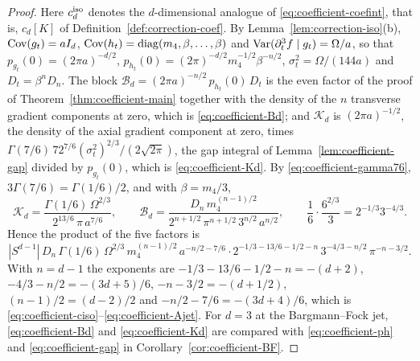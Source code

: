 \begin{proof}
Here $c_d^{\rm iso}$ denotes the $d$-dimensional analogue of \eqref{eq:coefficient-coefint}, that is, $c_d[K]$ of Definition~\ref{def:correction-coef}. By Lemma~\ref{lem:correction-iso}(b), $\operatorname{Cov}(g_t)=aI_d$, $\operatorname{Cov}(h_t)=\operatorname{diag}(m_4,\beta,\dots,\beta)$ and $\operatorname{Var}(\partial_t^3f\mid g_t)=\Omega/a$, so that $p_{g_t}(0)=(2\pi a)^{-d/2}$, $p_{h_t}(0)=(2\pi)^{-d/2}m_4^{-1/2}\beta^{-n/2}$, $\sigma_t^2=\Omega/(144a)$ and $D_t=\beta^nD_n$. The block $\mathcal B_d=(2\pi a)^{-n/2}\,p_{h_t}(0)\,D_t$ is the even factor of the proof of Theorem~\ref{thm:coefficient-main} together with the density of the $n$ transverse gradient components at zero, which is \eqref{eq:coefficient-Bd}; and $\mathcal K_d$ is $(2\pi a)^{-1/2}$, the density of the axial gradient component at zero, times $\Gamma(7/6)\,72^{7/6}(\sigma_t^2)^{2/3}/(2\sqrt{2\pi})$, the gap integral of Lemma~\ref{lem:coefficient-gap} divided by $p_{g_t}(0)$, which is \eqref{eq:coefficient-Kd}. By \eqref{eq:coefficient-gamma76}, $3\Gamma(7/6)=\Gamma(1/6)/2$, and with $\beta=m_4/3$,
\[
\mathcal K_d=\frac{\Gamma(1/6)\,\Omega^{2/3}}{2^{13/6}\,\pi\,a^{7/6}},\qquad
\mathcal B_d=\frac{D_n\,m_4^{(n-1)/2}}{2^{n+1/2}\,\pi^{n+1/2}\,3^{n/2}\,a^{n/2}},\qquad
\frac16\cdot\frac{6^{2/3}}{3}=2^{-1/3}3^{-4/3}.
\]
Hence the product of the five factors is
\[
|S^{d-1}|\,D_n\,\Gamma(1/6)\,\Omega^{2/3}\,m_4^{(n-1)/2}\,a^{-n/2-7/6}\cdot2^{-1/3-13/6-1/2-n}\,3^{-4/3-n/2}\,\pi^{-n-3/2}.
\]
With $n=d-1$ the exponents are $-1/3-13/6-1/2-n=-(d+2)$, $-4/3-n/2=-(3d+5)/6$, $-n-3/2=-(d+1/2)$, $(n-1)/2=(d-2)/2$ and $-n/2-7/6=-(3d+4)/6$, which is \eqref{eq:coefficient-ciso}--\eqref{eq:coefficient-Ajet}. For $d=3$ at the Bargmann--Fock jet, \eqref{eq:coefficient-Bd} and \eqref{eq:coefficient-Kd} are compared with \eqref{eq:coefficient-ph} and \eqref{eq:coefficient-gap} in Corollary~\ref{cor:coefficient-BF}.
\end{proof}


